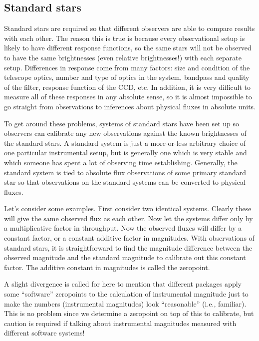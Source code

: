 \documentclass[12pt]{article}
\begin{document}
\subsection{Standard stars}
Standard stars are required so that different observers are able to
compare results with each other. The reason this is true is because
every observational setup is likely to have different response
functions, so the same stars will not be observed to have the same
brightnesses (even relative brightnesses!) with each separate setup.
Differences in response come from many factors: size and condition of
the telescope optics, number and type of optics in the system,
bandpass and quality of the filter, response function of the CCD, etc.
In addition, it is very difficult to measure all of these responses in
any absolute sense, so it is almost impossible to go straight from
observations to inferences about physical fluxes in absolute units.

To get around these problems, systems of standard stars have been set
up so observers can calibrate any new observations against the known
brightnesses of the standard stars. A standard system is just a
more-or-less arbitrary choice of one particular instrumental setup,
but is generally one which is very stable and which someone has spent
a lot of observing time establishing. Generally, the standard system
is tied to absolute flux observations of some primary standard star so
that observations on the standard systems can be converted to physical
fluxes.

Let's consider some examples. First consider two identical systems.
Clearly these will give the same observed flux as each other. Now let
the systems differ only by a multiplicative factor in throughput. Now
the observed fluxes will differ by a constant factor, or a constant
additive factor in magnitudes. With observations of standard stars, it
is straightforward to find the magnitude difference between the
observed magnitude and the standard magnitude to calibrate out this
constant factor. The additive constant in magnitudes is called the
zeropoint.

A slight divergence is called for here to mention that different
packages apply some ``software'' zeropoints to the calculation of
instrumental magnitude just to make the numbers (instrumental
magnitudes) look ``reasonable'' (i.e., familiar). This is no problem
since we determine a zeropoint on top of this to calibrate, but
caution is required if talking about instrumental magnitudes measured
with different software systems!
\end{document}
